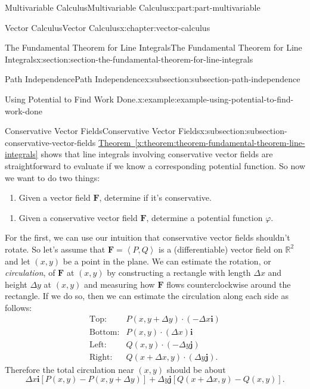 \documentclass[twoside,10pt,]{tufte-book}
\newcommand{\xreffont}{\relax}
\numberwithin{equation}{part}
\newcommand{\RR}{\mathbb{R}}
\newcommand{\vb}[1]{\mathbf{#1}}
\newcommand{\dotprod}[1]{\left\langle #1 \right\rangle}
\newcommand{\brackets}[1]{\left[ #1 \right]}
\newcommand{\amp}{&}
\begin{document}
\begin{partptx}{Multivariable Calculus}{}{Multivariable Calculus}{}{}{x:part:part-multivariable}
\begin{chapterptx}{Vector Calculus}{}{Vector Calculus}{}{}{x:chapter:vector-calculus}
\begin{sectionptx}{The Fundamental Theorem for Line Integrals}{}{The Fundamental Theorem for Line Integrals}{}{}{x:section:section-the-fundamental-theorem-for-line-integrals}
\begin{subsectionptx}{Path Independence}{}{Path Independence}{}{}{x:subsection:subsection-path-independence}
\begin{example}{Using Potential to Find Work Done.}{x:example:example-using-potential-to-find-work-done}
\end{example}
\end{subsectionptx}
%
%
\typeout{************************************************}
\typeout{************************************************}
%
\begin{subsectionptx}{Conservative Vector Fields}{}{Conservative Vector Fields}{}{}{x:subsection:subsection-conservative-vector-fields}
\hyperref[x:theorem:theorem-fundamental-theorem-line-integrals]{Theorem~{\xreffont\ref{x:theorem:theorem-fundamental-theorem-line-integrals}}} shows that line integrals involving conservative vector fields are straightforward to evaluate if we know a corresponding potential function. So now we want to do two things:%
\begin{enumerate}
\item{}Given a vector field \(\vb{F}\), determine if it's conservative.%
\end{enumerate}
%
\begin{enumerate}
\item{}Given a conservative vector field \(\vb{F}\), determine a potential function \(\varphi\).%
\end{enumerate}
%
\par
For the first, we can use our intuition that conservative vector fields shouldn't rotate. So let's assume that \(\vb{F} = \dotprod{P,Q}\) is a (differentiable) vector field on \(\RR^{2}\) and let \((x,y)\) be a point in the plane. We can estimate the rotation, or \emph{circulation}, of \(\vb{F}\) at \((x,y)\) by constructing a rectangle with length \(\Delta x\) and height \(\Delta y\) at \((x,y)\) and measuring how \(\vb{F}\) flows counterclockwise around the rectangle. If we do so, then we can estimate the circulation along each side as follows:%
\begin{align*}
\text{Top:} \amp P(x,y + \Delta y)\cdot(-\Delta x\vb{i})\\
\text{Bottom:} \amp P(x, y)\cdot(\Delta x)\vb{i}\\
\text{Left:} \amp Q(x,y)\cdot(-\Delta y\vb{j})\\
\text{Right:} \amp Q(x + \Delta x,y)\cdot(\Delta y\vb{j})\text{.}
\end{align*}
Therefore the total circulation near \((x,y)\) should be about%
\begin{equation*}
\Delta x\vb{i}\brackets{P(x,y) - P(x, y + \Delta y)} + \Delta y\vb{j}\brackets{Q(x + \Delta x, y) - Q(x,y)}\text{.}
\end{equation*}

\end{subsectionptx}
\end{sectionptx}
\end{chapterptx}
\end{partptx}
\end{document}
